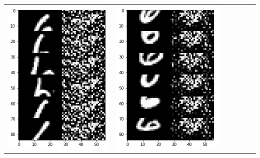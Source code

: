 \documentclass[12pt]{report} %
\begin{document}
\begin{tabular}{m{0.7cm}m{2.4cm}m{2.4cm}m{2.4cm}m{2.4cm}m{2.4cm}m{2.4cm}}
	\includegraphics[scale=0.3]{pictures/M2_6_up.png} & \includegraphics[scale=0.3]{pictures/M2_6_down.png}\\

\end{tabular}
\end{document}
